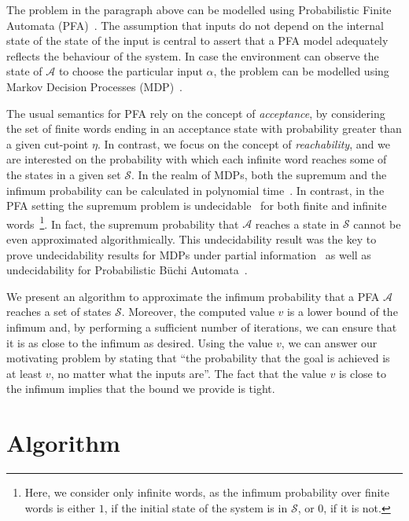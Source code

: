 \documentclass[final,3p,times,twocolumn]{elsarticle}
\theoremstyle{plain}
\theoremstyle{definition}
\newcommand{\reachset}{\mathcal{S}}
\newcommand{\sys}{\mathcal{A}}
\newcommand{\computed}{v}
\begin{document}
The problem in the paragraph above can be modelled using Probabilistic Finite
Automata (PFA)~\cite{DBLP:journals/iandc/Rabin63,DBLP:journals/ai/MadaniHC03}.
The assumption that inputs do not depend on the internal state of the
state of the input is central to assert that a PFA model adequately
reflects the behaviour of the system. In case the environment can observe
the state of $\sys$ to choose the particular input $\alpha$, the problem
can be modelled using Markov Decision Processes (MDP)~\cite{BOOK:Puterman}.


The usual semantics for PFA rely on the concept of \emph{acceptance},
by considering the set of finite words ending in an acceptance state
with probability greater than a given cut-point $\eta$. In contrast,
we focus on the concept of \emph{reachability}, and we are interested
on the probability with which each infinite word reaches some of the states
in a given set $\reachset$. In the realm of MDPs, both the supremum and
the infimum probability can be calculated in polynomial
time~\cite{DBLP:conf/fsttcs/BiancoA95}. In contrast, in the PFA setting
the supremum problem is undecidable~\cite{DBLP:journals/ai/MadaniHC03} for
both finite and infinite words~\footnote{Here, we consider only infinite words,
as the infimum probability over finite words is either $1$, if the initial
state of the system is in $\reachset$, or $0$, if it is not.}.
In fact, the supremum probability that $\sys$ reaches a state in
$\reachset$ cannot be even approximated algorithmically. This undecidability
result was the key to prove undecidability results for MDPs under partial
information~\cite{DBLP:conf/formats/GiroD07} as well as undecidability
for Probabilistic B\"uchi Automata~\cite{DBLP:conf/fossacs/BaierBG08}.

We present an algorithm to approximate the infimum probability that a PFA
$\sys$ reaches a set of states $\reachset$. Moreover, the computed value
$\computed$ is a lower bound of the infimum and, by performing a
sufficient number of iterations, we can ensure that it is as close to the
infimum as desired. Using the value $\computed$, we can answer our motivating
problem by stating that ``the probability that the goal is achieved is at
least $\computed$, no matter what the inputs are''. The fact that the value
$\computed$ is close to the infimum implies that the bound we provide is tight.

\section{Algorithm}
\end{document}
